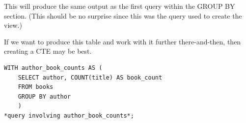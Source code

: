 \documentclass[8pt]{extarticle}
\begin{document}
\begin{multicols}{4}
This will produce the same output as the first query within the GROUP BY section. (This should be no surprise since this was the query used to create the view.)

If we want to produce this table and work with it further there-and-then, then creating a CTE may be best.

\vspace{0.5ex}
\begin{lstlisting}[style=sql]
WITH author_book_counts AS (
    SELECT author, COUNT(title) AS book_count
    FROM books
    GROUP BY author
    )
*query involving author_book_counts*;
\end{lstlisting}
\vspace{0.5ex}

\end{multicols}

\newpage
\thispagestyle{empty} 
\end{document}
